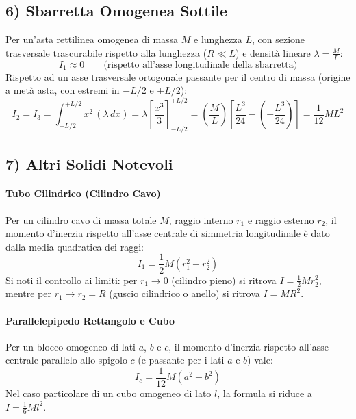\subsection{6) Sbarretta Omogenea Sottile}
Per un'asta rettilinea omogenea di massa $M$ e lunghezza $L$, con sezione trasversale trascurabile rispetto alla lunghezza ($R \ll L$) e densità lineare $\lambda = \frac{M}{L}$:
\begin{equation}
    I_1 \approx 0 \qquad \text{(rispetto all'asse longitudinale della sbarretta)}
\end{equation}
Rispetto ad un asse trasversale ortogonale passante per il centro di massa (origine a metà asta, con estremi in $-L/2$ e $+L/2$):
\begin{equation}
    I_2 = I_3 = \int_{-L/2}^{+L/2} x^2 \, (\lambda \, dx) = \lambda \left[ \frac{x^3}{3} \right]_{-L/2}^{+L/2} = \left( \frac{M}{L} \right) \left[ \frac{L^3}{24} - \left( -\frac{L^3}{24} \right) \right] = \frac{1}{12} M L^2
\end{equation}

\subsection{7) Altri Solidi Notevoli}
\paragraph{Tubo Cilindrico (Cilindro Cavo)}
Per un cilindro cavo di massa totale $M$, raggio interno $r_1$ e raggio esterno $r_2$, il momento d'inerzia rispetto all'asse centrale di simmetria longitudinale è dato dalla media quadratica dei raggi:
\begin{equation}
    I_1 = \frac{1}{2} M (r_1^2 + r_2^2)
\end{equation}
Si noti il controllo ai limiti: per $r_1 \to 0$ (cilindro pieno) si ritrova $I = \frac{1}{2}Mr_2^2$, mentre per $r_1 \to r_2 = R$ (guscio cilindrico o anello) si ritrova $I = MR^2$.

\paragraph{Parallelepipedo Rettangolo e Cubo}
Per un blocco omogeneo di lati $a$, $b$ e $c$, il momento d'inerzia rispetto all'asse centrale parallelo allo spigolo $c$ (e passante per i lati $a$ e $b$) vale:
\begin{equation}
    I_c = \frac{1}{12} M (a^2 + b^2)
\end{equation}
Nel caso particolare di un cubo omogeneo di lato $l$, la formula si riduce a $I = \frac{1}{6} M l^2$.


